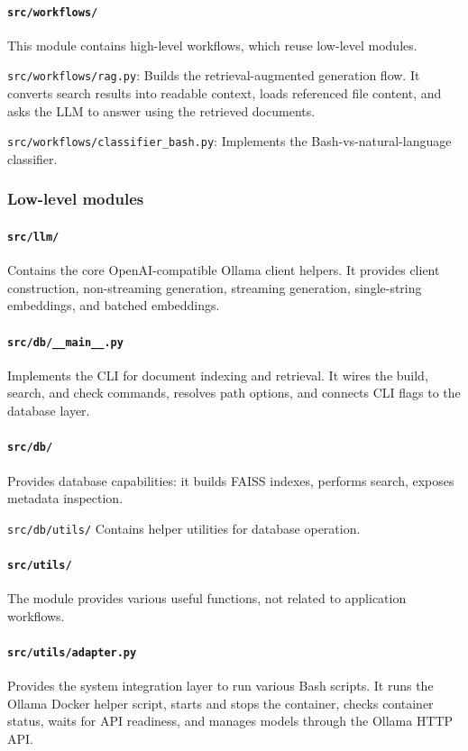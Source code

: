 \paragraph{\texttt{src/workflows/}}
This module contains high-level workflows, which reuse low-level modules.

\texttt{src/workflows/rag.py}:
Builds the retrieval-augmented generation flow. It converts search results into readable context,
loads referenced file content, and asks the LLM to answer using the retrieved documents.

\texttt{src/workflows/classifier\_bash.py}:
Implements the Bash-vs-natural-language classifier.


\subsubsection*{Low-level modules}

\paragraph{\texttt{src/llm/}}
Contains the core OpenAI-compatible Ollama client helpers. It provides client construction,
non-streaming generation, streaming generation, single-string embeddings, and batched embeddings.

\paragraph{\texttt{src/db/\_\_main\_\_.py}}
Implements the CLI for document indexing and retrieval. It wires the build, search, and check
commands, resolves path options, and connects CLI flags to the database layer.

\paragraph{\texttt{src/db/}}
Provides database capabilities: it builds FAISS indexes, performs search, exposes metadata
inspection.

\texttt{src/db/utils/}
Contains helper utilities for database operation.

\paragraph{\texttt{src/utils/}}
The module provides various useful functions, not related to application
workflows.

\paragraph{\texttt{src/utils/adapter.py}}
Provides the system integration layer to run various Bash scripts. It runs the
Ollama Docker helper script, starts and stops the container, checks container
status, waits for API readiness, and manages models through the Ollama HTTP API.


